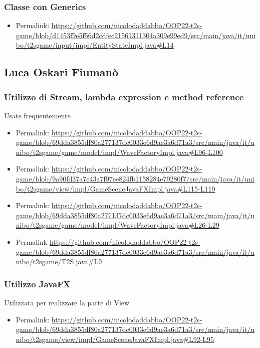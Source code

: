 \documentclass[a4paper,12pt]{report}
\begin{document}
\subsubsection*{Classe con Generics}
\begin{itemize}
	\item Permalink: \url{https://github.com/nicolodaddabbo/OOP22-t2s-game/blob/d1453f9e5f56d2cdfec21561311304a309e99ed9/src/main/java/it/unibo/t2sgame/input/impl/EntityStateImpl.java#L14}
\end{itemize}

\subsection*{Luca Oskari Fiumanò}
\subsubsection*{Utilizzo di Stream, lambda expression e method reference}
Usate frequentemente
\begin{itemize}
    \item Permalink: \url{https://github.com/nicolodaddabbo/OOP22-t2s-game/blob/69dda3855df80a277137dc0033e6d9ae3a6d71a3/src/main/java/it/unibo/t2sgame/game/model/impl/WaveFactoryImpl.java#L96-L100}
    \item Permalink: \url{https://github.com/nicolodaddabbo/OOP22-t2s-game/blob/9a90fd37a7e43a7f97ee824fb1158284e79280f7/src/main/java/it/unibo/t2sgame/view/impl/GameSceneJavaFXImpl.java#L115-L119}
    \item Permalink: \url{https://github.com/nicolodaddabbo/OOP22-t2s-game/blob/69dda3855df80a277137dc0033e6d9ae3a6d71a3/src/main/java/it/unibo/t2sgame/game/model/impl/WaveFactoryImpl.java#L26-L29}
    \item Permalink \url{https://github.com/nicolodaddabbo/OOP22-t2s-game/blob/69dda3855df80a277137dc0033e6d9ae3a6d71a3/src/main/java/it/unibo/t2sgame/T2S.java#L9}
\end{itemize}

\subsubsection*{Utilizzo JavaFX}
Utilizzata per realizzare la parte di View
\begin{itemize}
    \item Permalink: \url{https://github.com/nicolodaddabbo/OOP22-t2s-game/blob/69dda3855df80a277137dc0033e6d9ae3a6d71a3/src/main/java/it/unibo/t2sgame/view/impl/GameSceneJavaFXImpl.java#L92-L95}
\end{itemize}
\end{document}
